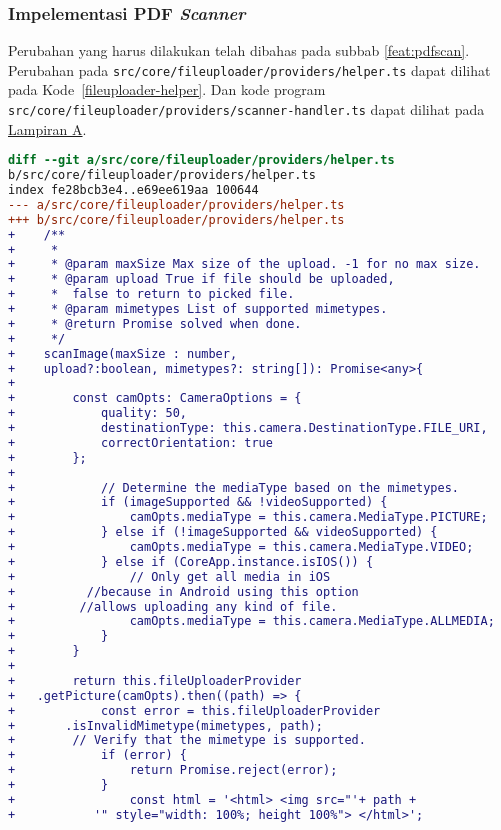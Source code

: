 \subsubsection{Impelementasi PDF \textit{Scanner}}
Perubahan yang harus dilakukan telah dibahas pada subbab \ref{feat:pdfscan}. Perubahan pada \texttt{src/core/fileuploader/providers/helper.ts} dapat dilihat pada \mbox{Kode \ref{fileuploader-helper}}. Dan kode program \texttt{src/core/fileuploader/providers/scanner-handler.ts} dapat dilihat pada \hyperref[lamp:A]{Lampiran A}.

\begin{lstlisting}[language=diff, frame=single, label ={fileuploader-helper}, caption = Perubahan pada \texttt{src/core/fileuploader/providers/helper.ts} ]
diff --git a/src/core/fileuploader/providers/helper.ts 
b/src/core/fileuploader/providers/helper.ts
index fe28bcb3e4..e69ee619aa 100644
--- a/src/core/fileuploader/providers/helper.ts
+++ b/src/core/fileuploader/providers/helper.ts
+    /**
+     * 
+     * @param maxSize Max size of the upload. -1 for no max size.
+     * @param upload True if file should be uploaded,
+     *  false to return to picked file.
+     * @param mimetypes List of supported mimetypes.  
+     * @return Promise solved when done.
+     */
+    scanImage(maxSize : number,
+    upload?:boolean, mimetypes?: string[]): Promise<any>{
+
+        const camOpts: CameraOptions = {
+            quality: 50,
+            destinationType: this.camera.DestinationType.FILE_URI,
+            correctOrientation: true
+        };
+
+            // Determine the mediaType based on the mimetypes.
+            if (imageSupported && !videoSupported) {
+                camOpts.mediaType = this.camera.MediaType.PICTURE;
+            } else if (!imageSupported && videoSupported) {
+                camOpts.mediaType = this.camera.MediaType.VIDEO;
+            } else if (CoreApp.instance.isIOS()) {
+                // Only get all media in iOS 
+	       //because in Android using this option 
+	      //allows uploading any kind of file.
+                camOpts.mediaType = this.camera.MediaType.ALLMEDIA;
+            }
+        }
+
+        return this.fileUploaderProvider
+	.getPicture(camOpts).then((path) => {
+            const error = this.fileUploaderProvider
+	    .isInvalidMimetype(mimetypes, path); 
+	     // Verify that the mimetype is supported.
+            if (error) {
+                return Promise.reject(error);
+            }
+                const html = '<html> <img src="'+ path +
+	        '" style="width: 100%; height 100%"> </html>';

\end{lstlisting}
